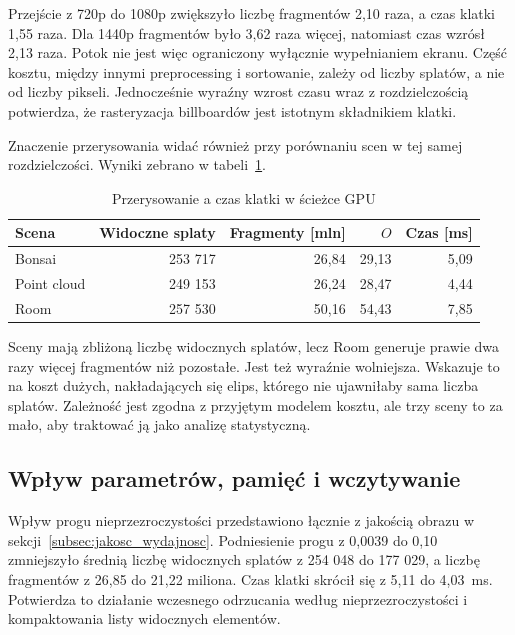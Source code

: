Przejście z 720p do 1080p zwiększyło liczbę fragmentów 2,10 raza, a czas klatki 1,55 raza. Dla 1440p fragmentów było 3,62 raza więcej, natomiast czas wzrósł 2,13 raza. Potok nie jest więc ograniczony wyłącznie wypełnianiem ekranu. Część kosztu, między innymi preprocessing i sortowanie, zależy od liczby splatów, a nie od liczby pikseli. Jednocześnie wyraźny wzrost czasu wraz z rozdzielczością potwierdza, że rasteryzacja billboardów jest istotnym składnikiem klatki.

Znaczenie przerysowania widać również przy porównaniu scen w tej samej rozdzielczości. Wyniki zebrano w tabeli~\ref{tab:overdraw_scen}.

\begin{table}[htbp]
  \centering
  \caption{Przerysowanie a czas klatki w ścieżce GPU}
  \label{tab:overdraw_scen}
  \small
  \renewcommand{\arraystretch}{1.12}
  \begin{tabular}{lrrrr}
    \toprule
    \textbf{Scena} & \textbf{Widoczne splaty} & \textbf{Fragmenty [mln]} &
    \textbf{$O$} & \textbf{Czas [ms]} \\
    \midrule
    Bonsai      & 253 717 & 26,84 & 29,13 & 5,09 \\
    Point cloud & 249 153 & 26,24 & 28,47 & 4,44 \\
    Room        & 257 530 & 50,16 & 54,43 & 7,85 \\
    \bottomrule
  \end{tabular}
\end{table}

Sceny mają zbliżoną liczbę widocznych splatów, lecz Room generuje prawie dwa razy więcej fragmentów niż pozostałe. Jest też wyraźnie wolniejsza. Wskazuje to na koszt dużych, nakładających się elips, którego nie ujawniłaby sama liczba splatów. Zależność jest zgodna z przyjętym modelem kosztu, ale trzy sceny to za mało, aby traktować ją jako analizę statystyczną.

\subsection{Wpływ parametrów, pamięć i wczytywanie}

Wpływ progu nieprzezroczystości przedstawiono łącznie z jakością obrazu w sekcji~\ref{subsec:jakosc_wydajnosc}. Podniesienie progu z 0,0039 do 0,10 zmniejszyło średnią liczbę widocznych splatów z 254 048 do 177 029, a liczbę fragmentów z 26,85 do 21,22 miliona. Czas klatki skrócił się z 5,11 do 4,03~ms. Potwierdza to działanie wczesnego odrzucania według nieprzezroczystości i kompaktowania listy widocznych elementów.

